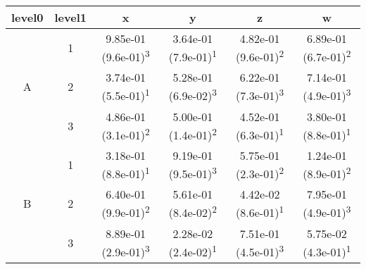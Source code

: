 \begin{tabular}{cccccc}
\toprule
level0 & level1&x&y&z&w\tabularnewline
\midrule
\multirow{3}{*}{A}&1& 9.85e-01 (9.6e-01)\textsuperscript{3}& 3.64e-01 (7.9e-01)\textsuperscript{1}& 4.82e-01 (9.6e-01)\textsuperscript{2}& 6.89e-01 (6.7e-01)\textsuperscript{2}\tabularnewline
&2& 3.74e-01 (5.5e-01)\textsuperscript{1}& 5.28e-01 (6.9e-02)\textsuperscript{3}& 6.22e-01 (7.3e-01)\textsuperscript{3}& 7.14e-01 (4.9e-01)\textsuperscript{3}\tabularnewline
&3& 4.86e-01 (3.1e-01)\textsuperscript{2}& 5.00e-01 (1.4e-01)\textsuperscript{2}& 4.52e-01 (6.3e-01)\textsuperscript{1}& 3.80e-01 (8.8e-01)\textsuperscript{1}\tabularnewline
\midrule
\multirow{3}{*}{B}&1& 3.18e-01 (8.8e-01)\textsuperscript{1}& 9.19e-01 (9.5e-01)\textsuperscript{3}& 5.75e-01 (2.3e-01)\textsuperscript{2}& 1.24e-01 (8.9e-01)\textsuperscript{2}\tabularnewline
&2& 6.40e-01 (9.9e-01)\textsuperscript{2}& 5.61e-01 (8.4e-02)\textsuperscript{2}& 4.42e-02 (8.6e-01)\textsuperscript{1}& 7.95e-01 (4.9e-01)\textsuperscript{3}\tabularnewline
&3& 8.89e-01 (2.9e-01)\textsuperscript{3}& 2.28e-02 (2.4e-02)\textsuperscript{1}& 7.51e-01 (4.5e-01)\textsuperscript{3}& 5.75e-02 (4.3e-01)\textsuperscript{1}\tabularnewline
\bottomrule
\end{tabular}
